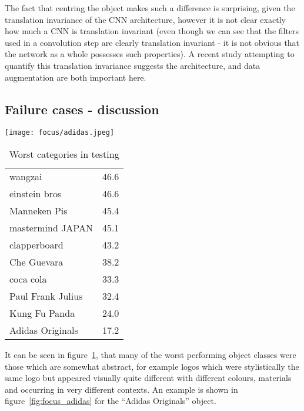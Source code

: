 The fact that centring the object makes such a difference is surprising, given the translation invariance of the CNN architecture, however it is not clear exactly how much a CNN is translation invariant (even though we can see that the filters used in a convolution step are clearly translation invariant - it is not obvious that the network as a whole possesses such properties). A recent study attempting to quantify this translation invariance \cite{EricKauderer-Abrams2016} suggests the architecture, and data augmentation are both important here. 


\subsection {Failure cases - discussion}


\begin{figure*}[t]
    \caption{Example of one hard case in the INSTRE dataset}
\centering
\texttt{[image: focus/adidas.jpeg]}
\label{fig:focus_adidas}
\end{figure*}



\begin{table}[h]
  \centering
    \caption{Worst categories in testing }
  \begin{tabular}{ l l }
  wangzai & 46.6 \\
  einstein bros & 46.6\\
  Manneken Pis & 45.4\\
  mastermind JAPAN & 45.1\\
  clapperboard & 43.2\\
  Che Guevara & 38.2\\
  coca cola & 33.3\\
  Paul Frank Julius & 32.4\\
  Kung Fu Panda & 24.0\\
  Adidas Originals & 17.2\\
    \bottomrule
  \end{tabular}
\label{fig:focus_failure}
\end{table}

It can be seen in figure~\ref{fig:focus_failure}, that many of the worst performing object classes were those which are somewhat abstract, for example logos which were stylistically the same logo but appeared visually quite different with different colours, materials and occurring in very different contexts. An example is shown in figure~\ref{fig:focus_adidas} for the ``Adidas Originals'' object.




